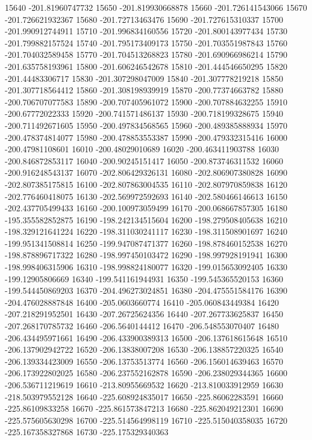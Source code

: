 {15640 -201.81960747732
15650 -201.819930668878
15660 -201.726141543066
15670 -201.726621932367
15680 -201.72713463476
15690 -201.727615310337
15700 -201.990912744911
15710 -201.996834160556
15720 -201.800143977434
15730 -201.799882157524
15740 -201.795173409173
15750 -201.703551987843
15760 -201.704032589458
15770 -201.704513268823
15780 -201.690966986214
15790 -201.635758193961
15800 -201.606246542678
15810 -201.444546650295
15820 -201.44483306717
15830 -201.307298047009
15840 -201.307778219218
15850 -201.307718564412
15860 -201.308198939919
15870 -200.77374663782
15880 -200.706707077583
15890 -200.707405961072
15900 -200.707884632255
15910 -200.67772022333
15920 -200.741571486137
15930 -200.718199328675
15940 -200.711492671605
15950 -200.497834568565
15960 -200.489385888934
15970 -200.478374814077
15980 -200.478853553387
15990 -200.479332315416
16000 -200.47981108601
16010 -200.48029010689
16020 -200.463411903788
16030 -200.846872853117
16040 -200.90245151417
16050 -200.873746311532
16060 -200.916248543137
16070 -202.806429326131
16080 -202.806907380828
16090 -202.807385175815
16100 -202.807863004535
16110 -202.807970859838
16120 -202.776460418075
16130 -202.569972592693
16140 -202.580466146613
16150 -202.437705499433
16160 -200.100973059499
16170 -200.068667857305
16180 -195.355582852875
16190 -198.242134515604
16200 -198.279508405638
16210 -198.329121641224
16220 -198.311030241117
16230 -198.311508901697
16240 -199.951341508814
16250 -199.947087471377
16260 -198.878460152538
16270 -198.878896717322
16280 -198.997450103472
16290 -198.997928191941
16300 -198.998406315906
16310 -198.998824180077
16320 -199.015653092405
16330 -199.12905806669
16340 -199.541161944931
16350 -199.545365520153
16360 -199.544450869203
16370 -204.496273024851
16380 -204.475551584176
16390 -204.476028887848
16400 -205.0603660774
16410 -205.060843449384
16420 -207.218291952501
16430 -207.26725624356
16440 -207.267733625837
16450 -207.268170785732
16460 -206.5640144412
16470 -206.548553070407
16480 -206.434495971661
16490 -206.433900389313
16500 -206.137618615648
16510 -206.137902942722
16520 -206.13838007208
16530 -206.138857220325
16540 -206.139334423009
16550 -206.13753513774
16560 -206.156014639463
16570 -206.173922802025
16580 -206.237552162878
16590 -206.238029344365
16600 -206.536711219619
16610 -213.80955669532
16620 -213.810033912959
16630 -218.503979552128
16640 -225.608924835017
16650 -225.86062283591
16660 -225.86109833258
16670 -225.861573847213
16680 -225.862049212301
16690 -225.575605630298
16700 -225.514564998119
16710 -225.515040358035
16720 -225.167358327868
16730 -225.175329340363
}
